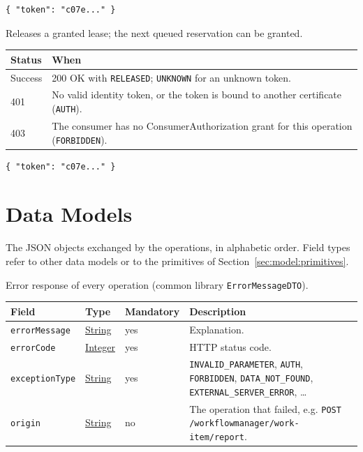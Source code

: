 \documentclass[a4paper]{arrowhead}
\newcommand{\pref}[1]{{\textcolor{ArrowheadGrey}{\hyperref[sec:model:primitives:#1]{#1}}}}
\begin{document}
\begin{lstlisting}[caption={Example request body}]
{ "token": "c07e..." }
\end{lstlisting}

Releases a granted lease; the next queued reservation can be granted.

{\small
\begin{longtable}{|p{2.0cm}|p{13.8cm}|}

\hline
\rowcolor{gray!33} Status & When \\ \hline
\endhead
Success & 200 OK with \texttt{RELEASED}; \texttt{UNKNOWN} for an unknown token. \\ \hline
401 & No valid identity token, or the token is bound to another certificate (\texttt{AUTH}). \\ \hline
403 & The consumer has no ConsumerAuthorization grant for this operation (\texttt{FORBIDDEN}). \\ \hline
\end{longtable}
}


\begin{lstlisting}[caption={Example request body}]
{ "token": "c07e..." }
\end{lstlisting}


\newpage
\section{Data Models}
\label{sec:model}
The JSON objects exchanged by the operations, in alphabetic order. Field types refer to other data models or to the
primitives of Section~\ref{sec:model:primitives}.

Error response of every operation (common library \texttt{ErrorMessageDTO}).

{\small
\begin{longtable}{|p{3.7cm}|p{4.2cm}|p{1.6cm}|p{6.3cm}|}

\hline
\rowcolor{gray!33} Field & Type & Mandatory & Description \\ \hline
\endhead
\texttt{errorMessage} & \pref{String} & yes & Explanation. \\ \hline
\texttt{errorCode} & \pref{Integer} & yes & HTTP status code. \\ \hline
\texttt{exceptionType} & \pref{String} & yes & \texttt{INVALID\_PARAMETER}, \texttt{AUTH}, \texttt{FORBIDDEN}, \texttt{DATA\_NOT\_FOUND}, \texttt{EXTERNAL\_SERVER\_ERROR}, \ldots \\ \hline
\texttt{origin} & \pref{String} & no & The operation that failed, e.g. \texttt{POST /workflowmanager/work-item/report}. \\ \hline
\end{longtable}
}
\end{document}
